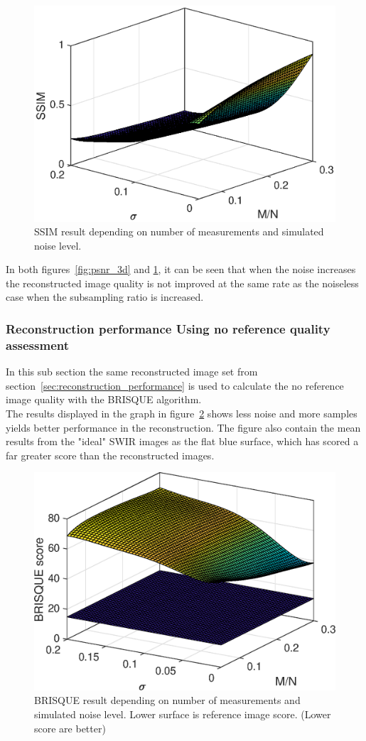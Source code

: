 \begin{figure}[H]
    \centering
    \includegraphics[width = 0.7\linewidth]{result/synt_sss/SSIM_fit.eps}
    \caption{SSIM result depending on number of measurements and simulated noise level.}
    \label{fig:ssim_3d}
\end{figure}

In both figures~\ref{fig:psnr_3d} and \ref{fig:ssim_3d}, it can be seen that when the noise increases the reconstructed image quality is not improved at the same rate as the noiseless case when the subsampling ratio is increased.

\subsubsection{Reconstruction performance Using no reference quality assessment}
In this sub section the same reconstructed image set from section~\ref{sec:reconstruction_performance} is used to calculate the no reference image quality with the BRISQUE algorithm.\\[0.1in] 

The results displayed in the graph in figure~\ref{fig:Brisque_3d} shows less noise and more samples yields better performance in the reconstruction. The figure also contain the mean results from the "ideal" SWIR images as the flat blue surface, which has scored a far greater score than the reconstructed images.
  

\begin{figure}[H]
    \centering
    \includegraphics[width = 0.7\linewidth]{result/synt_brisque/BRISQUE_fit.eps}
    \caption{BRISQUE result depending on number of measurements and simulated noise level. Lower surface is reference image score. (Lower score are better)}
    \label{fig:Brisque_3d}
\end{figure}

